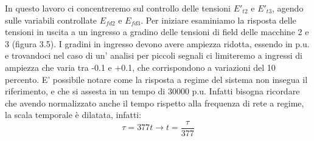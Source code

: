 \documentclass[Lau,noexaminfo]{sapthesis}
\begin{document}
\newpage	
	In questo lavoro ci concentreremo sul controllo delle tensioni $E'_{t2}$ e $E'_{t3}$, agendo sulle variabili controllate $E_{fd2}$ e $E_{fd3}$. Per iniziare esaminiamo la risposta delle tensioni in uscita a un ingresso a gradino delle tensioni di field delle macchine 2 e 3 (figura 3.5). I gradini in ingresso devono avere ampiezza ridotta, essendo in p.u. e trovandoci nel caso di un' analisi per piccoli segnali ci limiteremo a ingressi di ampiezza che varia tra -0.1 e +0.1, che corrispondono a variazioni del 10 percento. E' possibile notare come la risposta a regime del sistema non insegua il riferimento, e che si assesta in un tempo di 30000 p.u. Infatti bisogna ricordare che avendo normalizzato anche il tempo rispetto alla frequenza di rete a regime, la scala temporale è dilatata, infatti:\\
	\begin{equation}
	\tau=377t \rightarrow t=\frac{\tau}{377}
	\end{equation}
\end{document}

